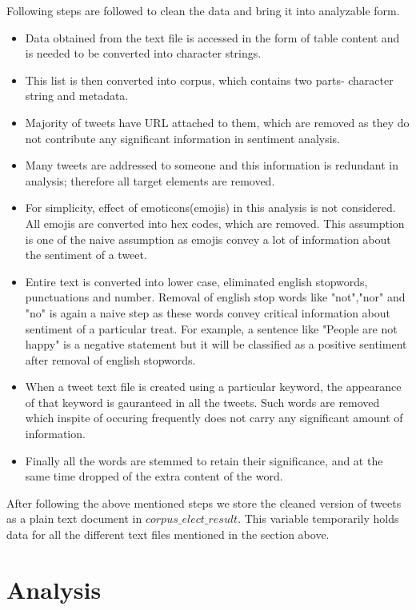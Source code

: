 \documentclass[a4paper,12pt]{book}
\theoremstyle{break}
\begin{document}
Following steps are followed to clean the data and bring it into analyzable form.
\begin{itemize}
\item Data obtained from the text file is accessed in the form of table content and is needed to be converted into character strings. 
\item This list is then converted into corpus, which contains two parts- character string and metadata.
\item Majority of tweets have URL attached to them, which are removed as they do not contribute any significant information in sentiment analysis.
\item Many tweets are addressed to someone and this information is redundant in analysis; therefore all target elements are removed.
\item For simplicity, effect of emoticons(emojis) in this analysis is not considered. All emojis are converted into hex codes, which are removed. This assumption is one of the naive assumption as emojis convey a lot of information about the sentiment of a tweet. 
\item Entire text is converted into lower case, eliminated english stopwords, punctuations and number. Removal of english stop words like "not","nor" and "no" is again a naive step as these words convey critical information about sentiment of a particular treat. For example, a sentence like "People are not happy" is a negative statement but it will be classified as a positive sentiment after removal of english stopwords.
\item When a tweet text file is created using a particular keyword, the appearance of that keyword is gauranteed in all the tweets. Such words are removed which inspite of occuring frequently does not carry any significant amount of information.
\item Finally all the words are stemmed to retain their significance, and at the same time dropped of the extra content of the word.
\end{itemize}



After following the above mentioned steps we store the cleaned version of tweets as a plain text document in $corpus\_elect\_result$. This variable temporarily holds data for all the different text files mentioned in the section above.

\section{Analysis}
\end{document}
